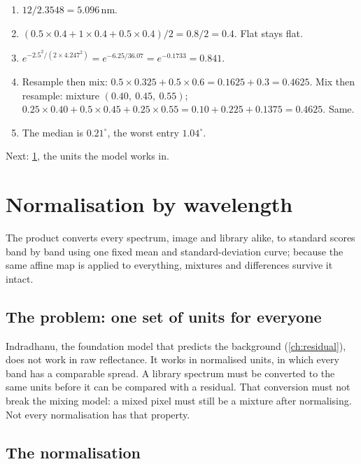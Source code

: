 \documentclass[11pt,a4paper,oneside,openany]{book}
\newcommand{\nextchapter}[1]{\par\medskip\noindent\hfill\textsf{\small Next: #1}\par}
\begin{document}
\begin{answers}
\begin{enumerate}
\item $12/2.3548=5.096$\,nm.
\item $(0.5\times0.4+1\times0.4+0.5\times0.4)/2=0.8/2=0.4$. Flat stays flat.
\item $e^{-2.5^2/(2\times4.247^2)}=e^{-6.25/36.07}=e^{-0.1733}=0.841$.
\item Resample then mix: $0.5\times0.325+0.5\times0.6=0.1625+0.3=0.4625$. Mix then resample: mixture $(0.40,\ 0.45,\ 0.55)$;
  $0.25\times0.40+0.5\times0.45+0.25\times0.55=0.10+0.225+0.1375=0.4625$. Same.
\item The median is $0.21^\circ$, the worst entry $1.04^\circ$.
\end{enumerate}
\end{answers}

\nextchapter{\cref{ch:normalise}, the units the model works in.}

\chapter{Normalisation by wavelength}
\label{ch:normalise}

\begin{onething}
The product converts every spectrum, image and library alike, to standard scores band by band using one fixed mean and
standard-deviation curve; because the same affine map is applied to everything, mixtures and differences survive it intact.
\end{onething}

\section{The problem: one set of units for everyone}

Indradhanu, the foundation model that predicts the background (\cref{ch:residual}), does not work in raw reflectance. It works in
normalised units, in which every band has a comparable spread. A library spectrum must be converted to the same units before it can
be compared with a residual. That conversion must not break the mixing model: a mixed pixel must still be a mixture after
normalising. Not every normalisation has that property.

\section{The normalisation}
\end{document}
